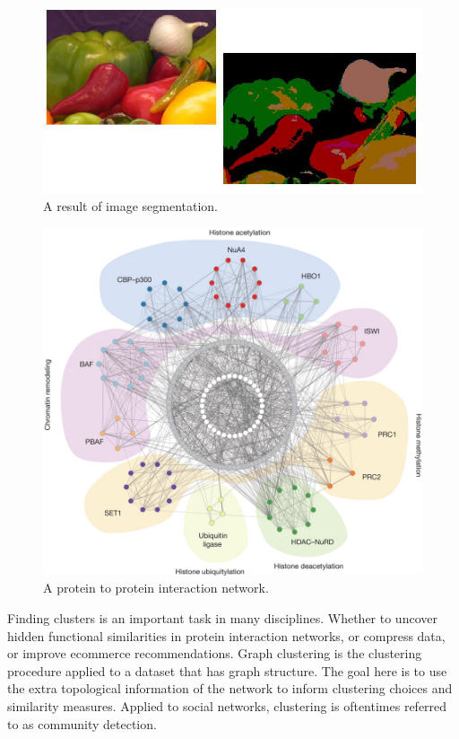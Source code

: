 \begin{figure}
\begin{center}
  \includegraphics[scale=0.35]{image_segmentation.jpg}
  \caption{A result of image segmentation.\cite{image_seg}}
  \label{fig:seg}
 \end{center}
\end{figure}

\begin{figure}
\begin{center}
  \includegraphics[scale=0.20]{protien_network.jpg}
  \caption{A protein to protein interaction network.\cite{protein}}
  \label{fig:protien}
 \end{center}
\end{figure}

Finding clusters is an important task in many disciplines. Whether to uncover hidden functional similarities in protein interaction networks, or compress data, or improve ecommerce recommendations.  Graph clustering is the clustering procedure applied to a dataset that has graph structure. The goal here is to use the extra topological information of the network to inform clustering choices and similarity measures. Applied to social networks, clustering is oftentimes referred to as community detection. 


